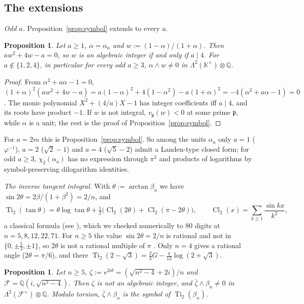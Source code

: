 \documentclass[11pt]{amsart}
\newtheorem{proposition}[theorem]{Proposition}
\theoremstyle{definition}
\theoremstyle{remark}
\numberwithin{equation}{section}
\newcommand{\QQ}{\mathbb{Q}}
\newcommand{\KK}{\mathbb{K}}
\newcommand{\cF}{\mathcal{F}}
\newcommand{\fp}{\mathfrak{p}}
\newcommand{\Ti}{\operatorname{Ti}}
\newcommand{\Cl}{\operatorname{Cl}}
\begin{document}
\subsection{The extensions}\label{sec:closed-ext}
\emph{Odd $a$.} Proposition~\ref{prop:symbol} extends to every $a$.

\begin{proposition}\label{prop:symbolodd}
Let $a\ge1$, $\alpha=\alpha_a$ and $w:=(1-\alpha)/(1+\alpha)$. Then $aw^2+4w-a=0$, so $w$ is an algebraic integer if and
only if $a\mid4$. For $a\notin\{1,2,4\}$, in particular for every odd $a\ge3$, $\alpha\wedge w\ne0$ in
$\Lambda^2(\KK^\times)\otimes\QQ$.
\end{proposition}

\begin{proof}
From $\alpha^2+a\alpha-1=0$, $(1+\alpha)^2(aw^2+4w-a)=a(1-\alpha)^2+4(1-\alpha^2)-a(1+\alpha)^2=-4(\alpha^2+a\alpha-1)=0$.
The monic polynomial $X^2+(4/a)X-1$ has integer coefficients iff $a\mid4$, and its roots have product $-1$. If $w$ is not
integral, $v_\fp(w)<0$ at some prime $\fp$, while $\alpha$ is a unit; the rest is the proof of
Proposition~\ref{prop:symbol}.
\end{proof}

For $a=2m$ this is Proposition~\ref{prop:symbol}. So among the units $\alpha_a$ only $a=1$ ($\varphi^{-1}$), $a=2$
($\sqrt2-1$) and $a=4$ ($\sqrt5-2$) admit a Landen-type closed form; for odd $a\ge3$, $\chi_2(\alpha_a)$ has no expression
through $\pi^2$ and products of logarithms by symbol-preserving dilogarithm identities.

\emph{The inverse tangent integral.} With $\theta:=\arctan\beta_n$ we have $\sin2\theta=2\beta/(1+\beta^2)=2/n$, and
\[
  \Ti_2(\tan\theta)=\theta\log\tan\theta+\tfrac12\bigl(\Cl_2(2\theta)+\Cl_2(\pi-2\theta)\bigr),\qquad
  \Cl_2(x)=\sum_{k\ge1}\frac{\sin kx}{k^2},
\]
a classical formula (see \cite{Lewin1981}), which we checked numerically to $80$ digits at $n=5,8,12,22,71$. For $n\ge5$
the value $\sin2\theta=2/n$ is rational and not in $\{0,\pm\frac12,\pm1\}$, so $2\theta$ is not a rational multiple of
$\pi$ \cite[Cor.~3.12]{Niven1956}. Only $n=4$ gives a rational angle ($2\theta=\pi/6$), and there
$\Ti_2(2-\sqrt3)=\frac23G-\frac\pi{12}\log(2+\sqrt3)$.

\begin{proposition}\label{prop:symbolti}
Let $n\ge5$, $\zeta:=e^{2i\theta}=(\sqrt{n^2-4}+2i)/n$ and $\cF=\QQ(i,\sqrt{n^2-4})$. Then $\zeta$ is not an algebraic
integer, and $\bar\zeta\wedge\beta_n\ne0$ in $\Lambda^2(\cF^\times)\otimes\QQ$. Modulo torsion, $\bar\zeta\wedge\beta_n$
is the symbol of $\Ti_2(\beta_n)$.
\end{proposition}
\end{document}
